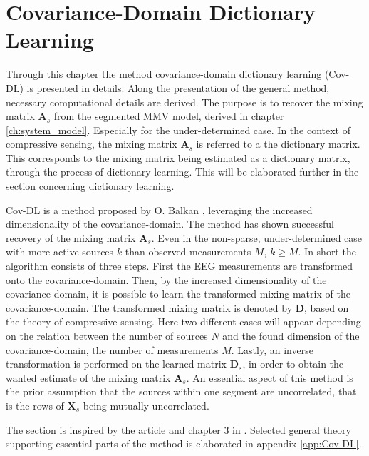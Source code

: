 \chapter{Covariance-Domain Dictionary Learning}\label{ch:Cov-DL}
Through this chapter the method covariance-domain dictionary learning (Cov-DL) is presented in details. 
Along the presentation of the general method, necessary computational details are derived.
The purpose is to recover the mixing matrix $\mathbf{A}_s$ from the segmented MMV model, derived in chapter \ref{ch:system_model}. Especially for the under-determined case. 
In the context of compressive sensing, the mixing matrix $\mathbf{A}_s$ is referred to a the dictionary matrix. 
This corresponds to the mixing matrix being estimated as a dictionary matrix, through the process of dictionary learning. 
This will be elaborated further in the section concerning dictionary learning.

Cov-DL is a method proposed by O. Balkan \cite{Balkan2015}, leveraging the increased dimensionality of the covariance-domain. 
The method has shown successful recovery of the mixing matrix $\mathbf{A}_s$. Even in the non-sparse, under-determined case with more active sources $k$ than observed measurements $M$, $k \geq M$. 
In short the algorithm consists of three steps. 
First the EEG measurements are transformed onto the covariance-domain. 
Then, by the increased dimensionality of the covariance-domain, it is possible to learn the transformed mixing matrix of the covariance-domain. The transformed mixing matrix is denoted by $\mathbf{D}$, based on the theory of compressive sensing. 
Here two different cases will appear depending on the relation between the number of sources $N$ and the found dimension of the covariance-domain, the number of measurements $M$. 
Lastly, an inverse transformation is performed on the learned matrix $\mathbf{D}_s$, in order to obtain the wanted estimate of the mixing matrix $\mathbf{A}_s$. 
An essential aspect of this method is the prior assumption that the sources within one segment are uncorrelated, that is the rows of $\mathbf{X}_s$ being mutually uncorrelated. 

The section is inspired by the article \cite{Balkan2015} and chapter 3 in \cite{phd2015}. 
Selected general theory supporting essential parts of the method is elaborated in appendix \ref{app:Cov-DL}.


%